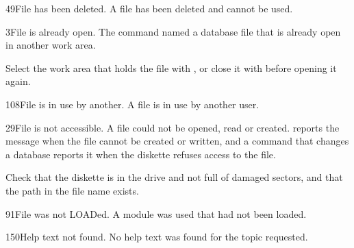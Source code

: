 \begin{XbaseMessageEntry}{49}{File has been deleted.}
A file has been deleted and cannot be used.
\end{XbaseMessageEntry}

\begin{XbaseMessageEntry}{3}{File is already open.}
The  command named a database file that is already open in another work area.

Select the work area that holds the file with , or close it with  before opening it again.
\end{XbaseMessageEntry}

\begin{XbaseMessageEntry}{108}{File is in use by another.}
A file is in use by another user.
\end{XbaseMessageEntry}

\begin{XbaseMessageEntry}{29}{File is not accessible.}
A file could not be opened, read or created.  reports the message when the  file cannot be created or written, and a command that changes a database reports it when the diskette refuses access to the file.

Check that the diskette is in the drive and not full of damaged sectors, and that the path in the file name exists.
\end{XbaseMessageEntry}

\begin{XbaseMessageEntry}{91}{File was not LOADed.}
A module was used that had not been loaded.
\end{XbaseMessageEntry}

\begin{XbaseMessageEntry}{150}{Help text not found.}
No help text was found for the topic requested.
\end{XbaseMessageEntry}

